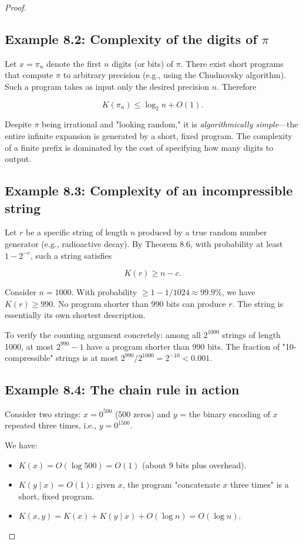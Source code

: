 \begin{proof}
\subsection{Example 8.2: Complexity of the digits of $\pi$}

Let $x = \pi_n$ denote the first $n$ digits (or bits) of $\pi$. There exist short programs that compute $\pi$ to arbitrary precision (e.g., using the Chudnovsky algorithm). Such a program takes as input only the desired precision $n$. Therefore

\[
K(\pi_n) \leq \log_2 n + O(1).
\]

Despite $\pi$ being irrational and "looking random," it is \textit{algorithmically simple}—the entire infinite expansion is generated by a short, fixed program. The complexity of a finite prefix is dominated by the cost of specifying how many digits to output.

\subsection{Example 8.3: Complexity of an incompressible string}

Let $r$ be a specific string of length $n$ produced by a true random number generator (e.g., radioactive decay). By Theorem 8.6, with probability at least $1 - 2^{-c}$, such a string satisfies

\[
K(r) \geq n - c.
\]

Consider $n = 1000$. With probability $\geq 1 - 1/1024 \approx 99.9\%$, we have $K(r) \geq 990$. No program shorter than 990 bits can produce $r$. The string is essentially its own shortest description.

To verify the counting argument concretely: among all $2^{1000}$ strings of length 1000, at most $2^{990} - 1$ have a program shorter than 990 bits. The fraction of "10-compressible" strings is at most $2^{990}/2^{1000} = 2^{-10} < 0.001$.

\subsection{Example 8.4: The chain rule in action}

Consider two strings: $x = 0^{500}$ (500 zeros) and $y$ = the binary encoding of $x$ repeated three times, i.e., $y = 0^{1500}$.

We have:
\begin{itemize}
  \item $K(x) = O(\log 500) = O(1)$ (about 9 bits plus overhead).
  \item $K(y \mid x) = O(1)$: given $x$, the program "concatenate $x$ three times" is a short, fixed program.
  \item $K(x, y) = K(x) + K(y \mid x) + O(\log n) = O(\log n)$.
\end{itemize}


\end{proof}
